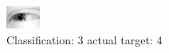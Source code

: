 \begin{figure}[h!]
\begin{center}
\includegraphics[width=0.60\columnwidth]{figures/ID2525_class_3_target_4.png}
\end{center}
\caption{ Classification: 3 actual target: 4}
\label{fig:ID2525_class_3_target_4}
\end{figure}
